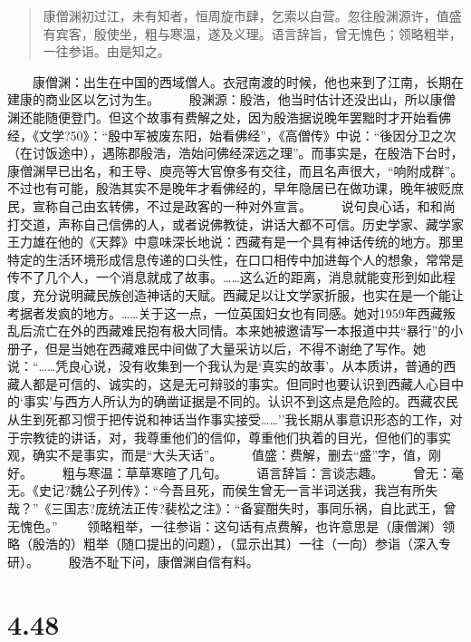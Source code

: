 \documentclass[]{book}
\begin{document}
\begin{quote}
康僧渊初过江，未有知者，恒周旋市肆，乞索以自营。忽往殷渊源许，值盛有宾客，殷使坐，粗与寒温，遂及义理。语言辞旨，曾无愧色；领略粗举，一往参诣。由是知之。
\end{quote}

　　康僧渊：出生在中国的西域僧人。衣冠南渡的时候，他也来到了江南，长期在建康的商业区以乞讨为生。
　　殷渊源：殷浩，他当时估计还没出山，所以康僧渊还能随便登门。但这个故事有费解之处，因为殷浩据说晚年罢黜时才开始看佛经，《文学?50》：``殷中军被废东阳，始看佛经''，《高僧传》中说：``後因分卫之次（在讨饭途中），遇陈郡殷浩，浩始问佛经深远之理''。而事实是，在殷浩下台时，康僧渊早已出名，和王导、庾亮等大官僚多有交往，而且名声很大，``响附成群''。不过也有可能，殷浩其实不是晚年才看佛经的，早年隐居已在做功课，晚年被贬庶民，宣称自己由玄转佛，不过是政客的一种对外宣言。
　　说句良心话，和和尚打交道，声称自己信佛的人，或者说佛教徒，讲话大都不可信。历史学家、藏学家王力雄在他的《天葬》中意味深长地说：西藏有是一个具有神话传统的地方。那里特定的生活环境形成信息传递的口头性，在口口相传中加进每个人的想象，常常是传不了几个人，一个消息就成了故事。\ldots{}\ldots{}这么近的距离，消息就能变形到如此程度，充分说明藏民族创造神话的天赋。西藏足以让文学家折服，也实在是一个能让考据者发疯的地方。\ldots{}\ldots{}关于这一点，一位英国妇女也有同感。她对1959年西藏叛乱后流亡在外的西藏难民抱有极大同情。本来她被邀请写一本报道中共``暴行''的小册子，但是当她在西藏难民中间做了大量采访以后，不得不谢绝了写作。她说：``\ldots{}\ldots{}凭良心说，没有收集到一个我认为是`真实的故事'。从本质讲，普通的西藏人都是可信的、诚实的，这是无可辩驳的事实。但同时也要认识到西藏人心目中的`事实'与西方人所认为的确凿证据是不同的。认识不到这点是危险的。西藏农民从生到死都习惯于把传说和神话当作事实接受\ldots{}\ldots{}''我长期从事意识形态的工作，对于宗教徒的讲话，对，我尊重他们的信仰，尊重他们执着的目光，但他们的事实观，确实不是事实，而是``大头天话''。
　　值盛：费解，删去``盛''字，值，刚好。 　　粗与寒温：草草寒暄了几句。
　　语言辞旨：言谈志趣。
　　曾无：毫无。《史记?魏公子列传》：``今吾且死，而侯生曾无一言半词送我，我岂有所失哉？''《三国志?庞统法正传?裴松之注》：``备宴酣失时，事同乐祸，自比武王，曾无愧色。''
　　领略粗举，一往参诣：这句话有点费解，也许意思是（康僧渊）领略（殷浩的）粗举（随口提出的问题），（显示出其）一往（一向）参诣（深入专研）。
　　殷浩不耻下问，康僧渊自信有料。

\section{4.48}\label{section-226}
\end{document}
